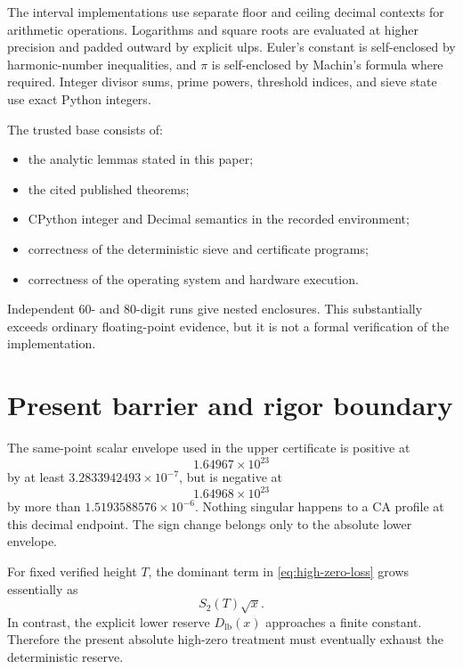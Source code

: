 \documentclass[11pt,a4paper]{article}
\numberwithin{equation}{section}
\theoremstyle{definition}
\begin{document}
The interval implementations use separate floor and ceiling decimal contexts
for arithmetic operations.  Logarithms and square roots are evaluated at
higher precision and padded outward by explicit ulps.  Euler's constant is
self-enclosed by harmonic-number inequalities, and \(\pi\) is self-enclosed
by Machin's formula where required.  Integer divisor sums, prime powers,
threshold indices, and sieve state use exact Python integers.

The trusted base consists of:
\begin{itemize}
  \item the analytic lemmas stated in this paper;
  \item the cited published theorems;
  \item CPython integer and Decimal semantics in the recorded environment;
  \item correctness of the deterministic sieve and certificate programs;
  \item correctness of the operating system and hardware execution.
\end{itemize}
Independent \(60\)- and \(80\)-digit runs give nested enclosures.  This
substantially exceeds ordinary floating-point evidence, but it is not a
formal verification of the implementation.

\section{Present barrier and rigor boundary}

The same-point scalar envelope used in the upper certificate is positive at
\[
  1.64967\times10^{23}
\]
by at least \(3.2833942493\times10^{-7}\), but is negative at
\[
  1.64968\times10^{23}
\]
by more than \(1.5193588576\times10^{-6}\).  Nothing singular happens to a CA
profile at this decimal endpoint.  The sign change belongs only to the
absolute lower envelope.

For fixed verified height \(T\), the dominant term in
\eqref{eq:high-zero-loss} grows essentially as
\[
  S_2(T)\sqrt{x}.
\]
In contrast, the explicit lower reserve \(D_{\mathrm{lb}}(x)\) approaches a
finite constant.  Therefore the present absolute high-zero treatment must
eventually exhaust the deterministic reserve.
\end{document}
